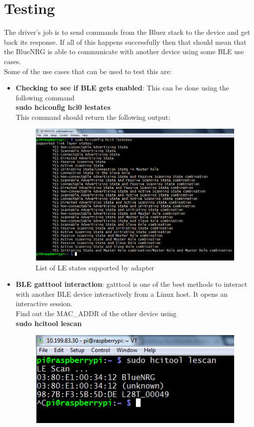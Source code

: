 \section{Testing}
The driver's job is to send commands from the Bluez stack to the device and get back its response. If all of this happens successfully then that should mean that the BlueNRG is able to communicate with another device using some BLE use cases.\\
Some of the use cases that can be used to test this are:\\
\begin{itemize}
	\item \textbf{Checking to see if BLE gets enabled}: This can be done using the following command\\
		\textbf{sudo hciconfig hci0 lestates}\\
		This command should return the following output:
		\begin{figure}[ht]
			\centering
			\includegraphics[scale=0.5]{images/lestates.png}
			\caption{List of LE states supported by adapter}
		\end{figure}
	\item \textbf{BLE gatttool interaction}: gatttool is one of the best methods to interact with another BLE device interactively from a Linux host. It opens an interactive session.\\
		Find out the MAC\_ADDR of the other device using\\
		\textbf{sudo hcitool lescan}
		\begin{figure}[ht]
			\centering
			\includegraphics[scale=0.5]{images/lescan.png}

\end{figure}
\end{itemize}
